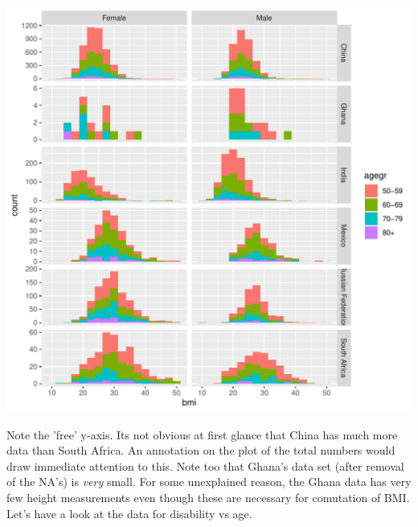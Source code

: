 \documentclass[titlepage]{book}\usepackage{knitr}
\begin{document}
\begin{knitrout}
\color{fgcolor}\begin{kframe}
\begin{alltt}
 \hlkwb{<-}  \hlstd{(}  \hlopt{+}
  \hlstd{(} \hlstd{=} \hlstd{)} \hlopt{+}
   \hlopt{~} \hlstd{=}\hlstd{)}
\end{alltt}
\end{kframe}
\includegraphics[width=\maxwidth]{figure/L1_FacetedHistograms-1} 

\end{knitrout}

Note the 'free' y-axis. Its not obvious at first glance that China has much more data than South Africa.  An annotation on the plot of the total numbers would draw immediate attention to this. Note too that Ghana's data set (after removal of the NA's) is \textsl{very} small. For some unexplained reason, the Ghana data has very few height measurements even though these are necessary for comutation of BMI.
Let's have a look at the data for disability vs age.
\end{document}
